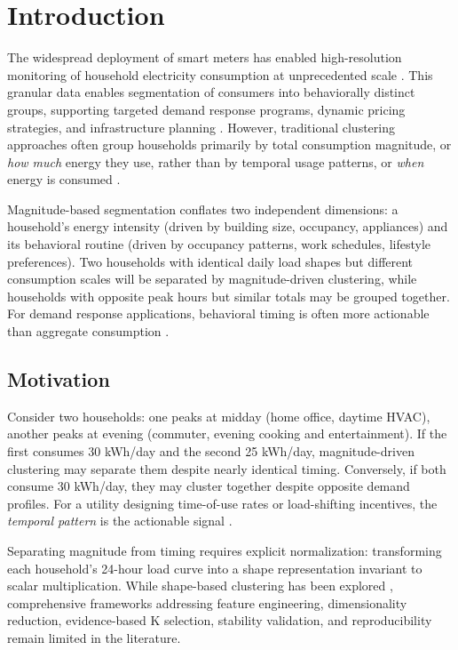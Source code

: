 \section{Introduction}
\label{sec:introduction}

The widespread deployment of smart meters has enabled high-resolution monitoring of household electricity consumption at unprecedented scale \cite{lazar2021investigating,kwac2014household}. This granular data enables segmentation of consumers into behaviorally distinct groups, supporting targeted demand response programs, dynamic pricing strategies, and infrastructure planning \cite{yan2021multiple,abdullah2025ml}. However, traditional clustering approaches often group households primarily by total consumption magnitude, or \emph{how much} energy they use, rather than by temporal usage patterns, or \emph{when} energy is consumed \cite{jin2016loadshape,rhodes2014clustering}.

Magnitude-based segmentation conflates two independent dimensions: a household's energy intensity (driven by building size, occupancy, appliances) and its behavioral routine (driven by occupancy patterns, work schedules, lifestyle preferences). Two households with identical daily load shapes but different consumption scales will be separated by magnitude-driven clustering, while households with opposite peak hours but similar totals may be grouped together. For demand response applications, behavioral timing is often more actionable than aggregate consumption \cite{haben2016analysis}.

\subsection{Motivation}

Consider two households: one peaks at midday (home office, daytime HVAC), another peaks at evening (commuter, evening cooking and entertainment). If the first consumes 30 kWh/day and the second 25 kWh/day, magnitude-driven clustering may separate them despite nearly identical timing. Conversely, if both consume 30 kWh/day, they may cluster together despite opposite demand profiles. For a utility designing time-of-use rates or load-shifting incentives, the \emph{temporal pattern} is the actionable signal \cite{afzalan2020twostage,valdes2021smart}.

Separating magnitude from timing requires explicit normalization: transforming each household's 24-hour load curve into a shape representation invariant to scalar multiplication. While shape-based clustering has been explored \cite{rahayu2021shape,jin2016loadshape}, comprehensive frameworks addressing feature engineering, dimensionality reduction, evidence-based K selection, stability validation, and reproducibility remain limited in the literature.

